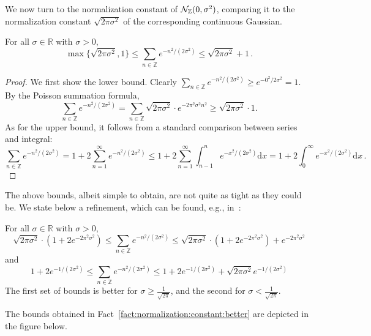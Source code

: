 \documentclass{jpc}
\newcommand{\dx}[1][x]{\mathrm{d}#1}
\newcommand{\Z}{\mathbb{Z}}
\newcommand{\R}{\mathbb{R}}
\begin{document}
We now turn to the normalization constant of $\discN(0,\sigma^2)$, comparing it to the normalization constant $\sqrt{2\pi\sigma^2}$ of the corresponding continuous Gaussian.
\begin{fact}\label{fact:normalization:constant}
    For all $\sigma \in \R$ with $\sigma>0$,
    \begin{equation}
        \max\{ \sqrt{2\pi\sigma^2} , 1\}
        \leq \sum_{n\in\Z} e^{-n^2/(2\sigma^2)} 
        \leq \sqrt{2\pi\sigma^2} + 1\,.
    \end{equation}
\end{fact}
\begin{proof}
We first show the lower bound. Clearly $\sum_{n\in\Z} e^{-n^2/(2\sigma^2)} \ge e^{-0^2/2\sigma^2}=1$. By the Poisson summation formula,
\[
        \sum_{n\in\Z} e^{-n^2/(2\sigma^2)} 
        = \sum_{n\in\Z} \sqrt{2\pi\sigma^2} \cdot e^{-2\pi^2\sigma^2n^2} 
        \geq \sqrt{2\pi\sigma^2} \cdot 1.
\]
As for the upper bound, it follows from a standard comparison between series and integral:
\[
        \sum_{n\in\Z} e^{-n^2/(2\sigma^2)} 
        = 1+ 2\sum_{n=1}^\infty e^{-n^2/(2\sigma^2)}
        \leq 1+ 2\sum_{n=1}^\infty \int_{n-1}^n e^{-x^2/(2\sigma^2)} \dx 
        = 1+ 2\int_{0}^\infty e^{-x^2/(2\sigma^2)} \dx\,. 
\]
\end{proof}
The above bounds, albeit simple to obtain, are not quite as tight as they could be. We state below a refinement, which can be found, e.g., in~\cite[Claim~2.8.1]{Stephens-Davidowitz17}:
\begin{fact}\label{fact:normalization:constant:better}
    For all $\sigma \in \R$ with $\sigma>0$,
    \begin{equation}
        \sqrt{2\pi\sigma^2} \cdot (1+2e^{-2\pi^2\sigma^2}) 
            \leq \sum_{n\in\Z} e^{-n^2/(2\sigma^2)} 
            \leq \sqrt{2\pi\sigma^2} \cdot (1+2e^{-2\pi^2\sigma^2}) + e^{-2\pi^2\sigma^2}
    \end{equation}
    and
    \begin{equation}
        1+2e^{-1/(2\sigma^2)}
            \leq \sum_{n\in\Z} e^{-n^2/(2\sigma^2)} 
            \leq 1+2e^{-1/(2\sigma^2)} + \sqrt{2\pi\sigma^2} e^{-1/(2\sigma^2)}
    \end{equation}
    The first set of bounds is better for $\sigma \geq \frac{1}{\sqrt{2\pi}}$, and the second for $\sigma < \frac{1}{\sqrt{2\pi}}$.
\end{fact}
\noindent The bounds obtained in Fact~\ref{fact:normalization:constant:better} are depicted in the figure below.
\end{document}
